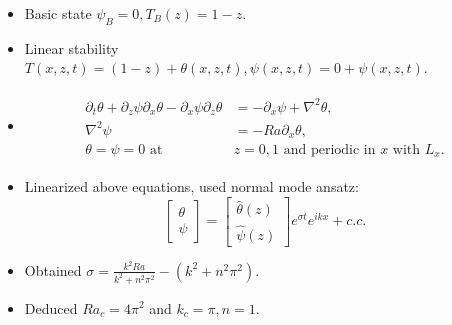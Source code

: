 \documentclass{article}
\newcommand{\lap}[1]{\nabla^{2}{#1}}
\begin{document}
\begin{itemize}
 \item Basic state $\psi_{B} = 0, T_{B} (z) = 1-z$.
 \item  Linear stability $T(x, z, t) = (1-z) + \theta(x, z, t), \psi(x, z, t) = 0 + \psi(x, z, t)$. 
 \item \begin{align} \label{eq:full_nl_eqns}
        \begin{split}
            \partial_{t} \theta + \partial_{z}\psi \partial_{x}\theta - \partial_{x}\psi \partial_{z}\theta &= -\partial_{x}\psi + \lap{\theta}, \\
            \lap{\psi} &= - Ra \partial_{x} \theta, \\
            \theta = \psi = 0 \textrm{ at } & z = 0, 1  \textrm{ and periodic in } x \textrm{ with } L_{x}. 
        \end{split}
       \end{align}
 \item Linearized above equations, used normal mode ansatz:\\
 \begin{equation}
    \begin{bmatrix}
              \theta \\
              \psi 
    \end{bmatrix} = 
    \begin{bmatrix}
      \hat{\theta}(z) \\
      \hat{\psi}(z) 
    \end{bmatrix} e^{\sigma t}e^{i k x} + c.c.
    \end{equation}
 \item Obtained $\sigma = \frac{k^{2}Ra}{k^{2}+n^{2}\pi^{2}} - (k^{2}+n^{2}\pi^{2})$.
 \item Deduced $Ra_{c} = 4\pi^{2}$ and $k_{c} = \pi, n = 1$.
\end{itemize}
\end{document}
